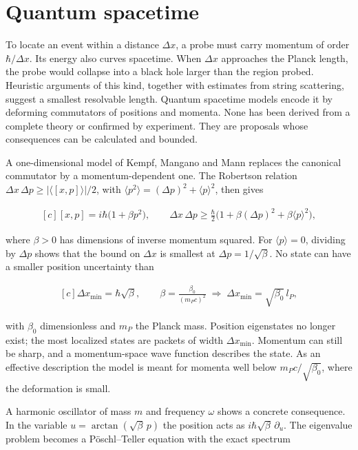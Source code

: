 \documentclass[11pt,oneside]{book}
\newenvironment{centeredalign}{\[\begin{gathered}[c]}{\end{gathered}\]}
\begin{document}
\section{Quantum spacetime}

\label{topic:quantum-spacetime}

To locate an event within a distance \(\Delta x\), a probe must carry momentum of order \(\hbar/\Delta x\). Its energy also curves spacetime. When \(\Delta x\) approaches the Planck length, the probe would collapse into a black hole larger than the region probed. Heuristic arguments of this kind, together with estimates from string scattering, suggest a smallest resolvable length. Quantum spacetime models encode it by deforming commutators of positions and momenta. None has been derived from a complete theory or confirmed by experiment. They are proposals whose consequences can be calculated and bounded.

A one-dimensional model of Kempf, Mangano and Mann replaces the canonical commutator by a momentum-dependent one. The Robertson relation \(\Delta x\,\Delta p\geq|\langle[x,p]\rangle|/2\), with \(\langle p^2\rangle=(\Delta p)^2+\langle p\rangle^2\), then gives

\begin{centeredalign}
[x,p]=i\hbar\big(1+\beta p^2\big),\qquad
\Delta x\,\Delta p\geq\frac\hbar2\Big(1+\beta(\Delta p)^2+\beta\langle p\rangle^2\Big),
\end{centeredalign}

where \(\beta>0\) has dimensions of inverse momentum squared. For \(\langle p\rangle=0\), dividing by \(\Delta p\) shows that the bound on \(\Delta x\) is smallest at \(\Delta p=1/\sqrt\beta\). No state can have a smaller position uncertainty than

\begin{centeredalign}
\Delta x_{\min}=\hbar\sqrt\beta,\qquad
\beta=\frac{\beta_0}{(m_Pc)^2}\;\Rightarrow\;\Delta x_{\min}=\sqrt{\beta_0}\,l_P,
\end{centeredalign}

with \(\beta_0\) dimensionless and \(m_P\) the Planck mass. Position eigenstates no longer exist; the most localized states are packets of width \(\Delta x_{\min}\). Momentum can still be sharp, and a momentum-space wave function describes the state. As an effective description the model is meant for momenta well below \(m_Pc/\sqrt{\beta_0}\), where the deformation is small.

A harmonic oscillator of mass \(m\) and frequency \(\omega\) shows a concrete consequence. In the variable \(u=\arctan(\sqrt\beta\,p)\) the position acts as \(i\hbar\sqrt\beta\,\partial_u\). The eigenvalue problem becomes a Pöschl--Teller equation with the exact spectrum
\end{document}
